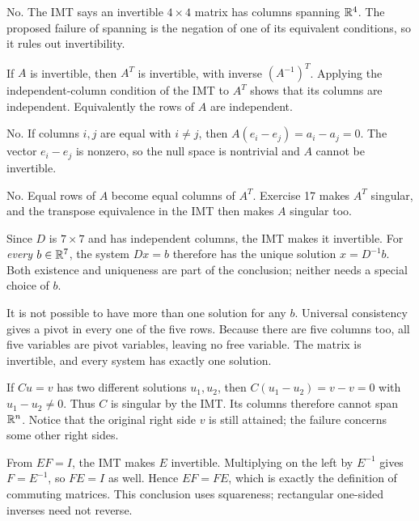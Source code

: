 No. The IMT says an invertible $4\times4$ matrix has columns spanning
$\mathbb{R}^4$. The proposed failure of spanning is the negation of one of its
equivalent conditions, so it rules out invertibility.

If $A$ is invertible, then $A^T$ is invertible, with inverse $(A^{-1})^T$.
Applying the independent-column condition of the IMT to $A^T$ shows that
its columns are independent. Equivalently the rows of $A$ are independent.

No. If columns $i,j$ are equal with $i\ne j$, then
$A(e_i-e_j)=a_i-a_j=0$. The vector $e_i-e_j$ is nonzero, so the null
space is nontrivial and $A$ cannot be invertible.

No. Equal rows of $A$ become equal columns of $A^T$.
Exercise 17 makes $A^T$ singular, and the transpose equivalence in the
IMT then makes $A$ singular too.

Since $D$ is $7\times7$ and has independent columns, the IMT makes it
invertible. For \emph{every} $b\in\mathbb{R}^7$, the system $Dx=b$ therefore
has the unique solution $x=D^{-1}b$. Both existence and uniqueness are
part of the conclusion; neither needs a special choice of $b$.

It is not possible to have more than one solution for any $b$.
Universal consistency gives a pivot in every one of the five rows.
Because there are five columns too, all five variables are pivot variables,
leaving no free variable. The matrix is invertible, and every system has
exactly one solution.

If $Cu=v$ has two different solutions $u_1,u_2$, then
$C(u_1-u_2)=v-v=0$ with $u_1-u_2\ne0$. Thus $C$ is singular by the
IMT. Its columns therefore cannot span $\mathbb{R}^n$. Notice that the original
right side $v$ is still attained; the failure concerns some other right sides.

From $EF=I$, the IMT makes $E$ invertible. Multiplying on the left by
$E^{-1}$ gives $F=E^{-1}$, so $FE=I$ as well.
Hence $EF=FE$, which is exactly the definition of commuting matrices.
This conclusion uses squareness; rectangular one-sided inverses need not reverse.

